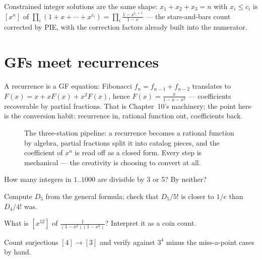 Constrained integer solutions are the same shape:
$x_1 + x_2 + x_3 = n$ with $x_i \le c_i$ is $[x^n]$ of
$\prod_i (1 + x + \cdots + x^{c_i}) = \prod_i \frac{1-x^{c_i+1}}{1-x}$ ---
the stars-and-bars count corrected by PIE, with the correction factors
already built into the numerator.

\section{GFs meet recurrences}\label{sec:gfrec}
A recurrence is a GF equation: Fibonacci $f_{n} = f_{n-1} + f_{n-2}$
translates to $F(x) = x + xF(x) + x^2F(x)$, hence
$F(x) = \frac{x}{1-x-x^2}$ --- coefficients recoverable by partial
fractions. That is Chapter~10's machinery; the point here is the
conversion habit: recurrence in, rational function out, coefficients
back.

\begin{figure}[ht]\centering

\caption{The three-station pipeline: a recurrence becomes a rational
function by algebra, partial fractions split it into catalog pieces,
and the coefficient of $x^n$ is read off as a closed form. Every step
is mechanical --- the creativity is choosing to convert at all.}
\label{fig:gfrec}
\end{figure}

\begin{exercise}[easy]\label{exr:pie2}
How many integers in $1..1000$ are divisible by 3 or 5? By neither?
\end{exercise}
\begin{exercise}[medium]\label{exr:d5}
Compute $D_5$ from the general formula; check that $D_5/5!$ is closer
to $1/e$ than $D_4/4!$ was.
\end{exercise}
\begin{exercise}[medium]\label{exr:gf}
What is $[x^{12}]$ of $\frac{1}{(1-x^2)(1-x^3)}$? Interpret it as a
coin count.
\end{exercise}
\begin{exercise}[medium]\label{exr:surj}
Count surjections $[4] \to [3]$ and verify against $3^4$ minus the
miss-a-point cases by hand.
\end{exercise}

